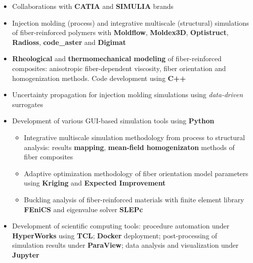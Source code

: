 \documentclass[10pt,a4paper,ragged2e,withhyper]{altacv}
\begin{document}
\begin{paracol}{2}

\begin{itemize}
\item Collaborations with \textbf{CATIA} and \textbf{SIMULIA} brands
\end{itemize}

\divider

\begin{itemize}
\item Injection molding (process) and integrative multiscale (structural) simulations of fiber-reinforced polymers with \textbf{Moldflow}, \textbf{Moldex3D}, \textbf{Optistruct}, \textbf{Radioss}, \textbf{code\_aster} and \textbf{Digimat}
\item \textbf{Rheological} and \textbf{thermomechanical modeling} of fiber-reinforced composites: anisotropic fiber-dependent viscosity, fiber orientation and homogenization methods. Code development using \textbf{C++}
\item Uncertainty propagation for injection molding simulations using \emph{data-driven} surrogates
\item Development of various GUI-based simulation tools using \textbf{Python}
  \begin{itemize}
    \item Integrative multiscale simulation methodology from process to structural analysis: results \textbf{mapping}, \textbf{mean-field homogenizaton} methods of fiber composites
    \item Adaptive optimization methodology of fiber orientation model parameters using \textbf{Kriging} and \textbf{Expected Improvement}
    \item Buckling analysis of fiber-reinforced materials with finite element library \textbf{FEniCS} and eigenvalue solver \textbf{SLEPc}
  \end{itemize}
\item Development of scientific computing tools: procedure automation under \textbf{HyperWorks} using \textbf{TCL}; \textbf{Docker} deployment; post-processing of simulation results under \textbf{ParaView}; data analysis and visualization under \textbf{Jupyter}
\end{itemize}


\end{paracol}
\end{document}
